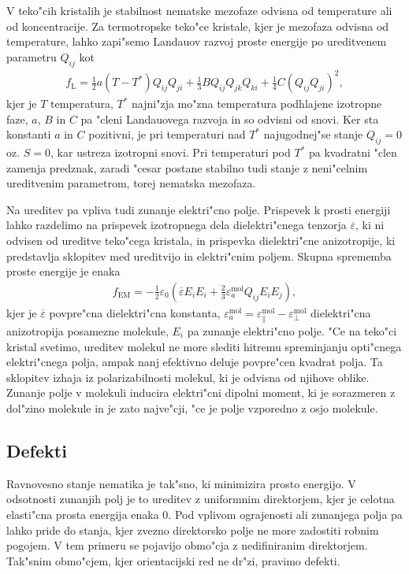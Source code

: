 \documentclass[a4paper,10pt]{article}
\begin{document}
V teko"cih kristalih je stabilnost nematske mezofaze odvisna od temperature ali od koncentracije. 
Za termotropske teko"ce kristale, kjer je mezofaza odvisna od temperature, lahko zapi"semo Landauov razvoj proste energije po ureditvenem parametru $Q_{ij}$ kot
\begin{align}
  f_{\mathrm{L}} = \frac{1}{2}a(T-T^*)Q_{ij}Q_{ji} + \frac{1}{3}BQ_{ij}Q_{jk}Q_{ki} + \frac{1}{4}C(Q_{ij}Q_{ji})^2,
\end{align}
kjer je $T$ temperatura, $T^*$ najni"zja mo"zna temperatura podhlajene izotropne faze, $a$, $B$ in $C$ pa "cleni Landauovega razvoja in so odvisni od snovi. 
Ker sta konstanti $a$ in $C$ pozitivni, je pri temperaturi nad $T^*$ najugodnej"se stanje $Q_{ij}=0$ oz. $S=0$, kar ustreza izotropni snovi. 
Pri temperaturi pod $T^*$ pa kvadratni "clen zamenja predznak, zaradi "cesar postane stabilno tudi stanje z neni"celnim ureditvenim parametrom, torej nematska mezofaza. 

Na ureditev pa vpliva tudi zunanje elektri"cno polje. 
Prispevek k prosti energiji lahko razdelimo na prispevek izotropnega dela dielektri"cnega tenzorja $\overline\varepsilon$, ki ni odvisen od ureditve teko"cega kristala, in prispevka dielektri"cne anizotropije, ki predstavlja sklopitev med ureditvijo in elektri"cnim poljem. 
Skupna sprememba proste energije je enaka
\begin{align}
\label{eq:dielektricna-sklopitev}
  f_{\mathrm{EM}} = -\frac{1}{2}\varepsilon_0 \left(\overline\varepsilon E_i E_i + \frac{2}{3}\varepsilon_a^{\mathrm{mol}} Q_{ij}E_iE_j \right),
\end{align}
kjer je $\overline{\varepsilon}$ povpre"cna dielektri"cna konstanta, $\varepsilon_a^{\mathrm{mol}} = \varepsilon_{\parallel}^{\mathrm{mol}} - \varepsilon_{\perp}^{\mathrm{mol}}$ dielektri"cna anizotropija posamezne molekule, $E_i$ pa zunanje elektri"cno polje. 
"Ce na teko"ci kristal svetimo, ureditev molekul ne more slediti hitremu spreminjanju opti"cnega elektri"cnega polja, ampak nanj efektivno deluje povpre"cen kvadrat polja. 
Ta sklopitev izhaja iz polarizabilnosti molekul, ki je odvisna od njihove oblike. 
Zunanje polje v molekuli inducira elektri"cni dipolni moment, ki je sorazmeren z dol"zino molekule in je zato najve"cji, "ce je polje vzporedno z osjo molekule. 

\subsection{Defekti}

Ravnovesno stanje nematika je tak"sno, ki minimizira prosto energijo. 
V odsotnosti zunanjih polj je to ureditev z uniformnim direktorjem, kjer je celotna elasti"cna prosta energija enaka 0\cite{mermin}. 
Pod vplivom ograjenosti ali zunanjega polja pa lahko pride do stanja, kjer zvezno direktorsko polje ne more zadostiti robnim pogojem. 
V tem primeru se pojavijo obmo"cja z nedifiniranim direktorjem. 
Tak"snim obmo"cjem, kjer orientacijski red ne dr"zi, pravimo defekti. 
\end{document}
